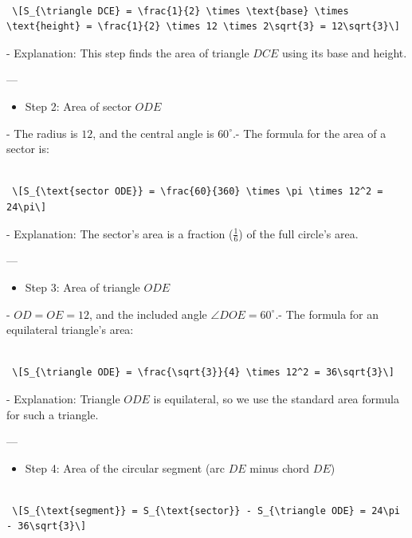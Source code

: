 \begin{enumerate}
 \begin{verbatim}

 \[S_{\triangle DCE} = \frac{1}{2} \times \text{base} \times \text{height} = \frac{1}{2} \times 12 \times 2\sqrt{3} = 12\sqrt{3}\]
\end{verbatim}

- Explanation: This step finds the area of triangle $DCE$ using its base and height.

 ---

 
            \begin{itemize}
        \item Step 2: Area of sector $ODE$
            \end{itemize}
            - The radius is $12$, and the central angle is $60^\circ$.- The formula for the area of a sector is:

 \begin{verbatim}

 \[S_{\text{sector ODE}} = \frac{60}{360} \times \pi \times 12^2 = 24\pi\]
\end{verbatim}

- Explanation: The sector's area is a fraction ($\frac{1}{6}$) of the full circle's area.

 ---

 
            \begin{itemize}
        \item Step 3: Area of triangle $ODE$
            \end{itemize}
            
- $OD = OE = 12$, and the included angle $\angle DOE = 60^\circ$.- The formula for an equilateral triangle's area:

 \begin{verbatim}

 \[S_{\triangle ODE} = \frac{\sqrt{3}}{4} \times 12^2 = 36\sqrt{3}\]
\end{verbatim}

- Explanation: Triangle $ODE$ is equilateral, so we use the standard area formula for such a triangle.

 ---

 
            \begin{itemize}
        \item Step 4: Area of the circular segment (arc $DE$ minus chord $DE$)
            \end{itemize}
            \begin{verbatim}

 \[S_{\text{segment}} = S_{\text{sector}} - S_{\triangle ODE} = 24\pi - 36\sqrt{3}\]
\end{verbatim}


\end{enumerate}

